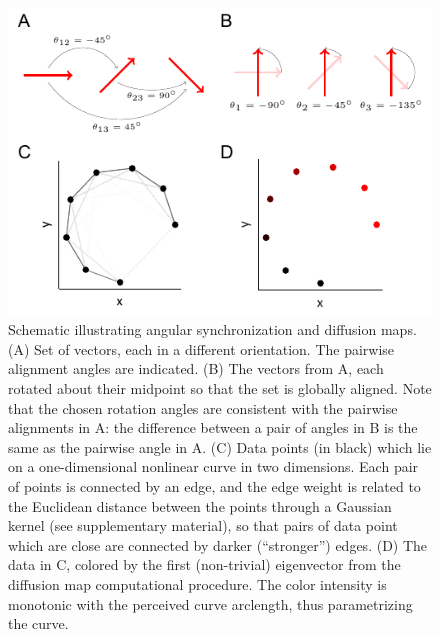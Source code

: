 \documentclass[twocolumn, 10pt]{article}
\newcommand{\SI}[0]{supplementary material}
\begin{document}
\begin{figure}[t]
\includegraphics{fig2}
\caption{Schematic illustrating angular synchronization and diffusion maps. (A) Set of vectors, each in a different orientation. The pairwise alignment angles are indicated. (B) The vectors from A, each rotated about their midpoint so that the set is globally aligned. Note that the chosen rotation angles are consistent with the pairwise alignments in A: the difference between a pair of angles in B is the same as the pairwise angle in A. (C) Data points (in black) which lie on a one-dimensional nonlinear curve in two dimensions. Each pair of points is connected by an edge, and the edge weight is related to the Euclidean distance between the points through a Gaussian kernel (see \SI), so that pairs of data point which are close are connected by darker (``stronger'') edges. (D) The data in C, colored by the first (non-trivial) eigenvector from the diffusion map computational procedure. The color intensity is monotonic with the perceived curve arclength, thus parametrizing the curve.}
\label{fig:schematics}
\end{figure}
\end{document}
